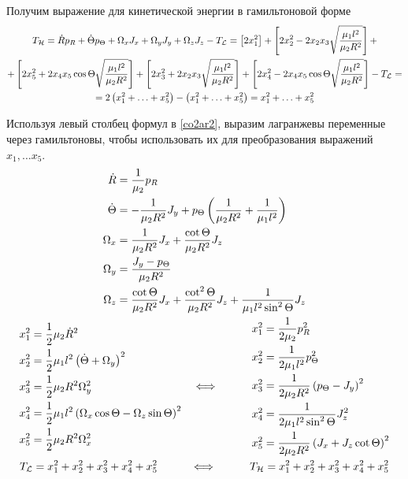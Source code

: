\documentclass[12pt]{article}
\newcommand{\lb}{\left(}
\newcommand{\rb}{\right)}
\newcommand{\mL}{\mathcal{L}}
\newcommand{\mH}{\mathcal{H}}
\newcommand{\dR}{\dot{R}}
\newcommand{\dT}{\dot{\Theta}}
\newcommand{\pT}{p_\Theta}
\begin{document}
Получим выражение для кинетической энергии в гамильтоновой форме
\begin{gather}
	T_\mH = \dR p_R + \dT \pT + \Omega_x J_x + \Omega_y J_y + \Omega_z J_z - T_\mL = \left[ 2 x_1^2 \right] + \left[ 2 x_2^2 - 2 x_2 x_3 \sqrt{\frac{\mu_1 l^2}{\mu_2 R^2}} \right] + \notag \\
	+ \left[ 2 x_5^2 + 2 x_4 x_5 \cos \Theta \sqrt{\frac{\mu_1 l^2}{\mu_2 R^2}} \right] + \left[ 2 x_3^2 + 2 x_2 x_3 \sqrt{\frac{\mu_1 l^2}{\mu_2 R^2}} \right] + \left[ 2 x_4^2 - 2 x_4 x_5 \cos \Theta \sqrt{\frac{\mu_1 l^2}{\mu_2 R^2}} \right] - T_\mL = \notag \\
	= 2 \left( x_1 ^2 + \ldots + x_5^2 \right) - \left( x_1^2 + \ldots + x_5^2 \right) = x_1^2 + \ldots + x_5^2 \notag   
\end{gather}

Используя левый столбец формул в \eqref{co2ar2}, выразим лагранжевы переменные через гамильтоновы, чтобы использовать их для преобразования выражений $x_1, \dots x_5$.
\begin{gather}
	\begin{aligned}
		\dR &= \frac{1}{\mu_2} p_R \\
		\dT &= - \frac{1}{\mu_2 R^2} J_y + \pT \lb \frac{1}{\mu_2 R^2} + \frac{1}{\mu_1 l^2} \rb \\
		\Omega_x &= \frac{1}{\mu_2 R^2} J_x + \frac{\cot \Theta}{\mu_2 R^2} J_z \\
		\Omega_y &= \frac{J_y - \pT}{\mu_2 R^2} \\
		\Omega_z &= \frac{\cot \Theta}{\mu_2 R^2} J_x + \frac{\cot^2 \Theta}{\mu_2 R^2} J_z + \frac{1}{\mu_1 l^2 \sin^2 \Theta} J_z
	\end{aligned} \notag \\
	\begin{aligned}
		x_1^2 &= \frac{1}{2} \mu_2 \dR^2 \\ 
		x_2^2 &= \frac{1}{2} \mu_1 l^2 \lb \dT + \Omega_y \rb^2 \\ 
		x_3^2 &= \frac{1}{2} \mu_2 R^2 \Omega_y^2 \\
		x_4^2 &= \frac{1}{2} \mu_1 l^2 \lb \Omega_x \cos \Theta - \Omega_z \sin \Theta \rb^2 \\	
		x_5^2 &= \frac{1}{2} \mu_2 R^2 \Omega_x^2 
	\end{aligned}
	\quad \Longleftrightarrow \quad \quad \quad 
	\begin{aligned}
		x_1^2 &= \frac{1}{2 \mu_2} p_R^2 \\
		x_2^2 &= \frac{1}{2 \mu_1 l^2} \pT^2 \\ 
		x_3^2 &= \frac{1}{2 \mu_2 R^2} \lb \pT - J_y \rb^2 \\
		x_4^2 &= \frac{1}{2 \mu_1 l^2 \sin^2 \Theta} J_z^2 \\ 
		x_5^2 &= \frac{1}{2 \mu_2 R^2} \lb J_x + J_z \cot \Theta \rb^2 
	\end{aligned} \notag \\
	T_\mL = x_1^2 + x_2^2 + x_3^2 + x_4^2 + x_5^2 \quad \quad \quad \Longleftrightarrow \quad \quad \quad T_\mH = x_1^2 + x_2^2 + x_3^2 + x_4^2 + x_5^2 \notag 
\end{gather}
\end{document}
